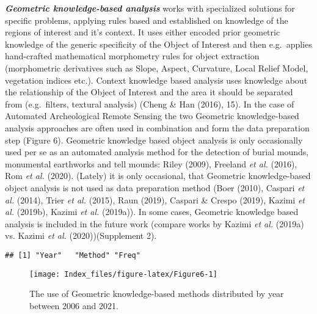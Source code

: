 \documentclass[
  12pt,
]{article}
\begin{document}
\textbf{\emph{Geometric knowledge-based analysis}} works with specialized solutions for specific problems, applying rules based and established on knowledge of the regions of interest and it's context. It uses either encoded prior geometric knowledge of the generic specificity of the Object of Interest and then e.g.~applies hand-crafted mathematical morphometry rules for object extraction (morphometric derivatives such as Slope, Aspect, Curvature, Local Relief Model, vegetation indices etc.). Context knowledge based analysis uses knowledge about the relationship of the Object of Interest and the area it should be separated from (e.g.~filters, textural analysis) (Cheng \& Han (2016), 15). In the case of Automated Archeological Remote Sensing the two Geometric knowledge-based analysis approaches are often used in combination and form the data preparation step (Figure 6). Geometric knowledge based object analysis is only occasionally used per se as an automated analysis method for the detection of burial mounds, monumental earthworks and tell mounds: Riley (2009), Freeland \emph{et al.} (2016), Rom \emph{et al.} (2020). (Lately) it is only occasional, that Geometric knowledge-based object analysis is not used as data preparation method (Boer (2010), Caspari \emph{et al.} (2014), Trier \emph{et al.} (2015), Raun (2019), Caspari \& Crespo (2019), Kazimi \emph{et al.} (2019b), Kazimi \emph{et al.} (2019a)). In some cases, Geometric knowledge based analysis is included in the future work (compare works by Kazimi \emph{et al.} (2019a) vs. Kazimi \emph{et al.} (2020))(Supplement 2).

\begin{verbatim}
## [1] "Year"   "Method" "Freq"
\end{verbatim}

\begin{figure}

{\centering \texttt{[image: Index\_files/figure-latex/Figure6-1]} 

}

\caption{The use of Geometric knowledge-based methods distributed by year between 2006 and 2021.}\label{fig:Figure6}
\end{figure}
\end{document}
